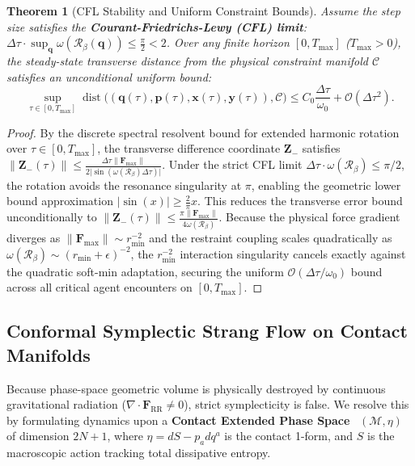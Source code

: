 \documentclass[11pt,a4paper,reqno]{article}
\theoremstyle{plain}
\newtheorem{theorem}{Theorem}[section]
\theoremstyle{definition}
\theoremstyle{remark}
\numberwithin{equation}{section}
\begin{document}
\begin{theorem}[CFL Stability and Uniform Constraint Bounds]
\label{thm:adaptive_bound}
Assume the step size satisfies the \textbf{Courant-Friedrichs-Lewy (CFL) limit}: $\Delta \tau \cdot \sup_{\bm{q}} \omega(\mathcal{R}_\beta(\bm{q})) \le \frac{\pi}{2} < 2$. Over any finite horizon $[0, T_{\max}]$ ($T_{\max} > 0$), the steady-state transverse distance from the physical constraint manifold $\mathcal{C}$ satisfies an unconditional uniform bound:
\begin{equation}
\sup_{\tau \in [0, T_{\max}]} \operatorname{dist}\big((\bm{q}(\tau), \bm{p}(\tau), \bm{x}(\tau), \bm{y}(\tau)), \mathcal{C}\big) \le C_0 \frac{\Delta \tau}{\omega_0} + \mathcal{O}(\Delta \tau^2).
\end{equation}
\end{theorem}
\begin{proof}
By the discrete spectral resolvent bound for extended harmonic rotation over $\tau \in [0, T_{\max}]$, the transverse difference coordinate $\bm{Z}_-$ satisfies $\lVert\bm{Z}_-(\tau)\rVert \le \frac{\Delta \tau \lVert\bm{F}_{\max}\rVert}{2 \lvert\sin(\omega(\mathcal{R}_\beta) \Delta \tau)\rvert}$. Under the strict CFL limit $\Delta \tau \cdot \omega(\mathcal{R}_\beta) \le \pi/2$, the rotation avoids the resonance singularity at $\pi$, enabling the geometric lower bound approximation $\lvert\sin(x)\rvert \ge \frac{2}{\pi}x$. This reduces the transverse error bound unconditionally to $\lVert\bm{Z}_-(\tau)\rVert \le \frac{\pi \lVert\bm{F}_{\max}\rVert}{4 \omega(\mathcal{R}_\beta)}$. Because the physical force gradient diverges as $\lVert\bm{F}_{\max}\rVert \sim r_{\min}^{-2}$ and the restraint coupling scales quadratically as $\omega(\mathcal{R}_\beta) \sim (r_{\min} + \epsilon)^{-2}$, the $r_{\min}^{-2}$ interaction singularity cancels exactly against the quadratic soft-min adaptation, securing the uniform $\mathcal{O}(\Delta \tau / \omega_0)$ bound across all critical agent encounters on $[0, T_{\max}]$.
\end{proof}

\subsection{Conformal Symplectic Strang Flow on Contact Manifolds}
Because phase-space geometric volume is physically destroyed by continuous gravitational radiation ($\nabla \cdot \bm{F}_{\mathrm{RR}} \ne 0$), strict symplecticity is false. We resolve this by formulating dynamics upon a \textbf{Contact Extended Phase Space}~\cite{Bravetti2017} $(\mathcal{M}, \eta)$ of dimension $2N+1$, where $\eta = dS - p_a dq^a$ is the contact 1-form, and $S$ is the macroscopic action tracking total dissipative entropy.
\end{document}
